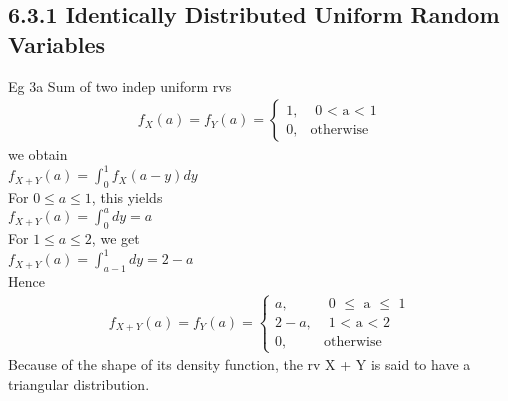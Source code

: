 \documentclass{article}
\begin{document}
\subsection*{6.3.1 Identically Distributed Uniform Random Variables}
Eg 3a Sum of two indep uniform rvs \\
\begin{align*}
    f_X(a) = f_Y(a) = \begin{cases}
                        1, & \text{ 0 < a < 1} \\
                        0, & \text{otherwise}
                      \end{cases}
\end{align*}
we obtain \\
$f_{X+Y}(a) = \int_{0}^1f_X(a-y)dy$\\
For $0 \leq a \leq 1$, this yields \\
$f_{X+Y}(a) = \int_{0}^a dy = a$\\
For $1 \leq a \leq 2$, we get \\
$f_{X+Y}(a) = \int_{a-1}^1 dy = 2 - a$\\
Hence 
\begin{align*}
    f_{X+Y}(a)  = f_Y(a) = \begin{cases}
                        a, & \text{ 0 $\leq$ a $\leq$ 1} \\
                        2 - a, & \text{ 1 < a < 2} \\
                        0, & \text{otherwise}
                      \end{cases}
\end{align*}
Because of the shape of its density function, the rv X + Y is said to have a triangular distribution. 



\end{document}

